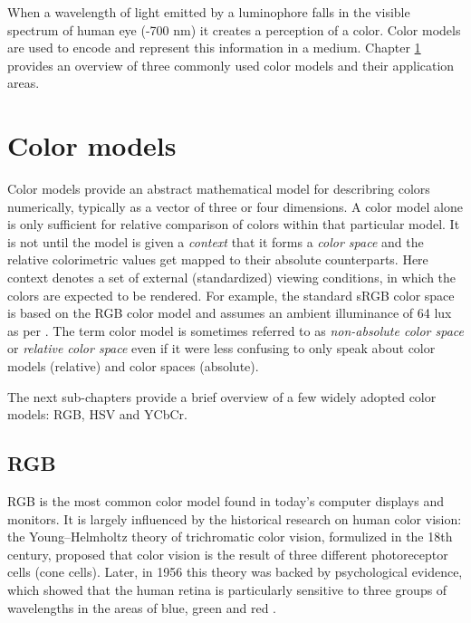 \documentclass[thesis.tex]{subfiles}
\begin{document}
When a wavelength of light emitted by a luminophore falls in the visible spectrum of human eye (-700 nm) it creates a perception of a color. Color models are used to encode and represent this information in a medium. Chapter \ref{section:rgbhsv} provides an overview of three commonly used color models and their application areas.

\section{Color models}
\label{section:rgbhsv}

Color models provide an abstract mathematical model for describring colors numerically, typically as a vector of three or four dimensions. A color model alone is only sufficient for relative comparison of colors within that particular model. It is not until the model is given a \textit{context} that it forms a \textit{color space} and the relative colorimetric values get mapped to their absolute counterparts. Here context denotes a set of external (standardized) viewing conditions, in which the colors are expected to be rendered. For example, the standard sRGB color space is based on the RGB color model and assumes an ambient illuminance of 64 lux as per \cite{iec}. The term color model is sometimes referred to as \textit{non-absolute color space} or \textit{relative color space} even if it were less confusing to only speak about color models (relative) and color spaces (absolute).

The next sub-chapters provide a brief overview of a few widely adopted color models: RGB, HSV and YCbCr.

\subsection{RGB}
RGB is the most common color model found in today's computer displays and monitors. It is largely influenced by the historical research on human color vision: the Young–Helmholtz theory of trichromatic color vision, formulized in the 18th century, proposed that color vision is the result of three different photoreceptor cells (cone cells). Later, in 1956 this theory was backed by psychological evidence, which showed that the human retina is particularly sensitive to three groups of wavelengths in the areas of blue, green and red \cite{svaetichin}.
\end{document}
